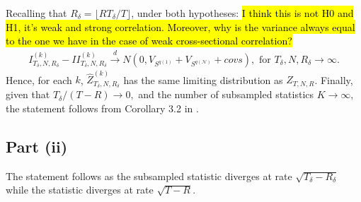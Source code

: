 Recalling that $R_\delta=\lfloor R T_\delta/T \rfloor$, under both hypotheses: \hl{I think this is not H0 and H1, it's weak and strong correlation. Moreover, why is the variance always equal to the one we have in the case of weak cross-sectional correlation?}
\begin{align*}
I_{T_\delta,N,R_\delta}^{(k)}-II_{T_\delta,N,R_\delta}^{(k)} \overset{d}{\rightarrow }N\left( 0,V_{S^{q(1)}}+V_{S^{q(\mathcal{N})}}+ covs \right) ,\text{ for }T_\delta,N,R_\delta\rightarrow \infty.
\end{align*}
Hence, for each $k$, $\widehat{Z}_{T_\delta,N,R_\delta}^{(k)}$ has the same limiting distribution as $\widehat{Z}_{T,N,R}$. Finally, given that $T_\delta/(T-R)\rightarrow 0,$ and the number of subsampled statistics $K\rightarrow \infty ,$ the statement follows from Corollary 3.2 in \cite{politis1992general}. 

\subsection{Part (ii)}

The statement follows as the subsampled statistic diverges at rate $\sqrt{T_\delta-R_\delta}$ while the statistic diverges at rate $\sqrt{T-R}.$